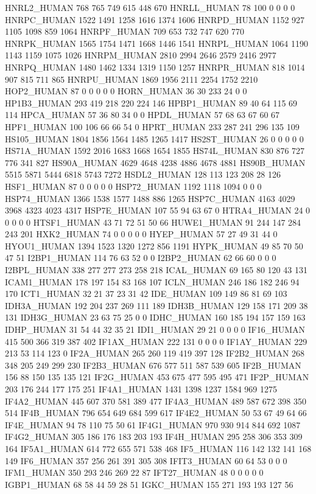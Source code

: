 HNRL2_HUMAN	768	765	749	615	448	670
HNRLL_HUMAN	78	100	0	0	0	0
HNRPC_HUMAN	1522	1491	1258	1616	1374	1606
HNRPD_HUMAN	1152	927	1105	1098	859	1064
HNRPF_HUMAN	709	653	732	747	620	770
HNRPK_HUMAN	1565	1754	1471	1668	1446	1541
HNRPL_HUMAN	1064	1190	1143	1159	1075	1026
HNRPM_HUMAN	2810	2994	2646	2579	2416	2977
HNRPQ_HUMAN	1480	1462	1334	1319	1150	1257
HNRPR_HUMAN	818	1014	907	815	711	865
HNRPU_HUMAN	1869	1956	2111	2254	1752	2210
HOP2_HUMAN	87	0	0	0	0	0
HORN_HUMAN	36	30	233	24	0	0
HP1B3_HUMAN	293	419	218	220	224	146
HPBP1_HUMAN	89	40	64	115	69	114
HPCA_HUMAN	57	36	80	34	0	0
HPDL_HUMAN	57	68	63	67	60	67
HPF1_HUMAN	100	106	66	66	54	0
HPRT_HUMAN	233	287	241	296	135	109
HS105_HUMAN	1804	1856	1564	1485	1265	1417
HS2ST_HUMAN	26	0	0	0	0	0
HS71A_HUMAN	1592	2016	1683	1668	1654	1855
HS74L_HUMAN	830	876	727	776	341	827
HS90A_HUMAN	4629	4648	4238	4886	4678	4881
HS90B_HUMAN	5515	5871	5444	6818	5743	7272
HSDL2_HUMAN	128	113	123	208	28	126
HSF1_HUMAN	87	0	0	0	0	0
HSP72_HUMAN	1192	1118	1094	0	0	0
HSP74_HUMAN	1366	1538	1577	1488	886	1265
HSP7C_HUMAN	4163	4029	3968	4323	4023	4317
HSP7E_HUMAN	107	55	94	63	67	0
HTRA4_HUMAN	24	0	0	0	0	0
HTSF1_HUMAN	43	71	72	51	50	66
HUWE1_HUMAN	91	244	147	284	243	201
HXK2_HUMAN	74	0	0	0	0	0
HYEP_HUMAN	57	27	49	31	44	0
HYOU1_HUMAN	1394	1523	1320	1272	856	1191
HYPK_HUMAN	49	85	70	50	47	51
I2BP1_HUMAN	114	76	63	52	0	0
I2BP2_HUMAN	62	66	60	0	0	0
I2BPL_HUMAN	338	277	277	273	258	218
ICAL_HUMAN	69	165	80	120	43	131
ICAM1_HUMAN	178	197	154	83	168	107
ICLN_HUMAN	246	186	182	246	94	170
ICT1_HUMAN	32	21	37	23	31	42
IDE_HUMAN	109	149	86	81	69	103
IDH3A_HUMAN	192	204	237	269	111	189
IDH3B_HUMAN	129	158	171	209	38	131
IDH3G_HUMAN	23	63	75	25	0	0
IDHC_HUMAN	160	185	194	157	159	163
IDHP_HUMAN	31	54	44	32	35	21
IDI1_HUMAN	29	21	0	0	0	0
IF16_HUMAN	415	500	366	319	387	402
IF1AX_HUMAN	222	131	0	0	0	0
IF1AY_HUMAN	229	213	53	114	123	0
IF2A_HUMAN	265	260	119	419	397	128
IF2B2_HUMAN	268	348	205	249	299	230
IF2B3_HUMAN	676	577	511	587	539	605
IF2B_HUMAN	156	88	150	135	135	121
IF2G_HUMAN	453	675	477	595	495	471
IF2P_HUMAN	203	176	244	177	175	251
IF4A1_HUMAN	1431	1398	1237	1584	969	1275
IF4A2_HUMAN	445	607	370	581	389	477
IF4A3_HUMAN	489	587	672	398	350	514
IF4B_HUMAN	796	654	649	684	599	617
IF4E2_HUMAN	50	53	67	49	64	66
IF4E_HUMAN	94	78	110	75	50	61
IF4G1_HUMAN	970	930	914	844	692	1087
IF4G2_HUMAN	305	186	176	183	203	193
IF4H_HUMAN	295	258	306	353	309	164
IF5A1_HUMAN	614	772	655	571	538	468
IF5_HUMAN	116	142	132	141	168	149
IF6_HUMAN	357	256	261	391	305	308
IFIT3_HUMAN	60	64	53	0	0	0
IFM1_HUMAN	350	293	246	269	22	87
IFT27_HUMAN	48	0	0	0	0	0
IGBP1_HUMAN	68	58	44	59	28	51
IGKC_HUMAN	155	271	193	193	127	56
